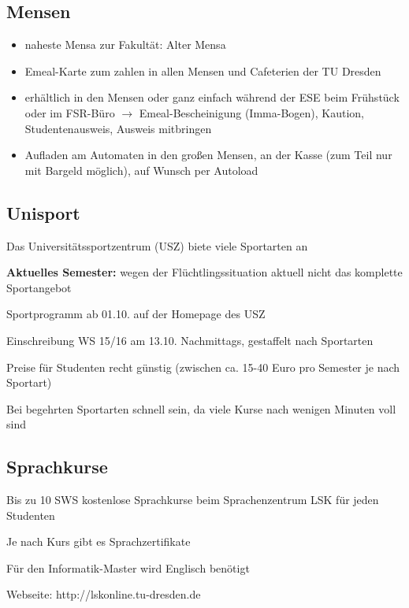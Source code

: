 \documentclass[a4paper,12pt]{report}
\begin{document}
\subsection{Mensen}
\begin{itemize}
	\item naheste Mensa zur Fakultät: Alter Mensa
	\item Emeal-Karte zum zahlen in allen Mensen und Cafeterien der TU Dresden
	\item erhältlich in den Mensen oder ganz einfach während der ESE beim Frühstück oder im FSR-Büro
	$\rightarrow$ Emeal-Bescheinigung (Imma-Bogen),  Kaution, Studentenausweis, Ausweis mitbringen
	\item Aufladen am Automaten in den großen Mensen, an der Kasse (zum Teil nur mit Bargeld möglich), auf Wunsch per Autoload
\end{itemize}

\subsection{Unisport}
Das Universitätssportzentrum (USZ) biete viele Sportarten an
\begin{itemize*}
\item \textbf{Aktuelles Semester:} wegen der Flüchtlingssituation aktuell nicht das komplette Sportangebot
\item Sportprogramm ab 01.10. auf der Homepage des USZ
\item Einschreibung WS 15/16 am 13.10. Nachmittags, gestaffelt nach Sportarten
\item Preise für Studenten recht günstig (zwischen ca. 15-40 Euro pro Semester je nach Sportart)
\item Bei begehrten Sportarten schnell sein, da viele Kurse nach wenigen Minuten voll sind
\end{itemize*}

\subsection{Sprachkurse}
\begin{itemize*}
\item Bis zu 10 SWS kostenlose Sprachkurse beim Sprachenzentrum LSK für jeden Studenten
\item Je nach Kurs gibt es Sprachzertifikate
\item Für den Informatik-Master wird Englisch benötigt
\item Webseite: http://lskonline.tu-dresden.de
\end{itemize*}
\end{document}
